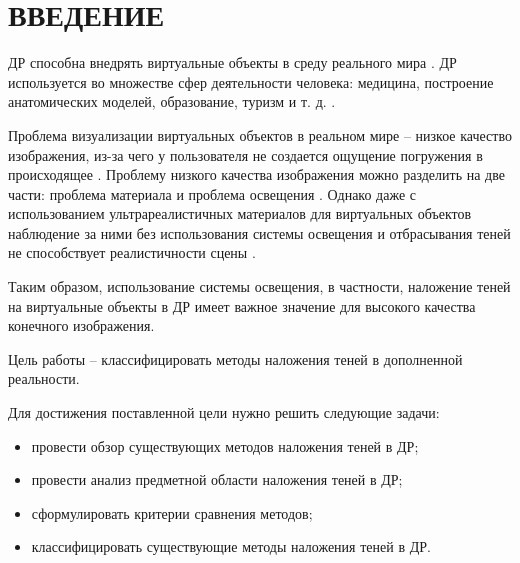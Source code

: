 \chapter*{ВВЕДЕНИЕ}

ДР способна внедрять виртуальные объекты в среду реального мира \cite{rtsm}. ДР используется во множестве сфер деятельности человека: медицина, построение анатомических моделей, образование, туризм и т. д. \cite{tech-ar}.

Проблема визуализации виртуальных объектов в реальном мире -- низкое качество изображения, из-за чего у пользователя не создается ощущение погружения в происходящее \cite{rtsm}. Проблему низкого качества изображения можно разделить на две части: проблема материала и проблема освещения \cite{rtsm}. Однако даже с использованием ультрареалистичных материалов для виртуальных объектов наблюдение за ними без использования системы освещения и отбрасывания теней не способствует реалистичности сцены \cite{rtsm}.

Таким образом, использование системы освещения, в частности, наложение теней на виртуальные объекты в ДР имеет важное значение для высокого качества конечного изображения.

Цель работы -- классифицировать методы наложения теней в дополненной реальности.

Для достижения поставленной цели нужно решить следующие задачи:

\begin{itemize}
	\item провести обзор существующих методов наложения теней в ДР;
	\item провести анализ предметной области наложения теней в ДР;
	\item сформулировать критерии сравнения методов;
	\item классифицировать существующие методы наложения теней в ДР.
\end{itemize}